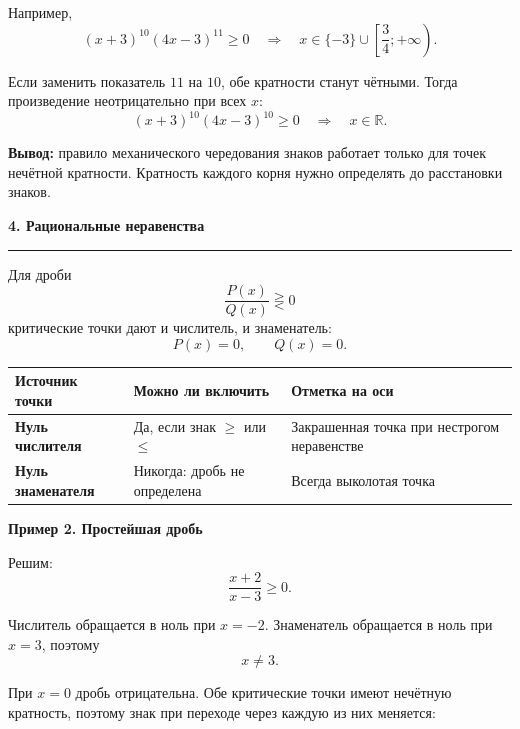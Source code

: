 \documentclass[a4paper,12pt]{article}
\newcommand{\sectiontitle}[1]{%
  \vspace{0.65em}
  {\Large\bfseries\textcolor{darkaccent}{#1}}\par
  \vspace{0.25em}
  {\color{accent}\rule{\linewidth}{0.5pt}}
  \vspace{0.45em}
}
\newcommand{\subsectiontitle}[1]{%
  \vspace{0.5em}
  {\large\bfseries\textcolor{darkaccent}{#1}}\par
  \vspace{0.2em}
}
\newcommand{\important}[1]{\textbf{\textcolor{darkaccent}{#1}}}
\newcommand{\R}{\mathbb{R}}
\newcommand{\openpoint}[2]{%
  \draw[accent, line width=0.9pt, fill=white] (#1,0) circle (2.4pt)
    node[below=7pt, text=black] {$#2$};
}
\newcommand{\closedpoint}[2]{%
  \filldraw[accent] (#1,0) circle (2.4pt)
    node[below=7pt, text=black] {$#2$};
}
\begin{document}
Например,
\[
(x+3)^{10}(4x-3)^{11}\ge0
\quad\Longrightarrow\quad
x\in\{-3\}\cup\left[\frac34;+\infty\right).
\]

Если заменить показатель $11$ на $10$, обе кратности станут чётными. Тогда произведение неотрицательно при всех $x$:
\[
(x+3)^{10}(4x-3)^{10}\ge0
\quad\Longrightarrow\quad
x\in\R.
\]

\important{Вывод:} правило механического чередования знаков работает только для точек нечётной кратности. Кратность каждого корня нужно определять до расстановки знаков.

\sectiontitle{4. Рациональные неравенства}

Для дроби
\[
\frac{P(x)}{Q(x)}\mathrel{\gtreqless}0
\]
критические точки дают и числитель, и знаменатель:
\[
P(x)=0,\qquad Q(x)=0.
\]

\begin{center}
\renewcommand{\arraystretch}{1.45}
\begin{tabularx}{\linewidth}{@{}>{\bfseries}l X X@{}}
\toprule
Источник точки & Можно ли включить & Отметка на оси \\
\midrule
Нуль числителя & Да, если знак $\ge$ или $\le$ & Закрашенная точка при нестрогом неравенстве \\
Нуль знаменателя & Никогда: дробь не определена & Всегда выколотая точка \\
\bottomrule
\end{tabularx}
\end{center}

\subsectiontitle{Пример 2. Простейшая дробь}

Решим:
\[
\frac{x+2}{x-3}\ge0.
\]

Числитель обращается в ноль при $x=-2$. Знаменатель обращается в ноль при $x=3$, поэтому
\[
x\ne3.
\]

При $x=0$ дробь отрицательна. Обе критические точки имеют нечётную кратность, поэтому знак при переходе через каждую из них меняется:

\begin{center}
\end{center}
\end{document}
